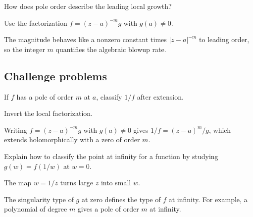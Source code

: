 \begin{exercise}\label{exr:iv09-expand-14}
How does pole order describe the leading local growth?
\end{exercise}
\begin{hint}
Use the factorization \(f=(z-a)^{-m}g\) with \(g(a)\ne0\).
\end{hint}
\begin{solution}
The magnitude behaves like a nonzero constant times \(|z-a|^{-m}\) to leading order, so the integer \(m\) quantifies the algebraic blowup rate.
\end{solution}

\subsection*{Challenge problems}

\begin{exercise}\label{exr:iv09-expand-15}
If \(f\) has a pole of order \(m\) at \(a\), classify \(1/f\) after extension.
\end{exercise}
\begin{hint}
Invert the local factorization.
\end{hint}
\begin{solution}
Writing \(f=(z-a)^{-m}g\) with \(g(a)\ne0\) gives \(1/f=(z-a)^m/g\), which extends holomorphically with a zero of order \(m\).
\end{solution}

\begin{exercise}\label{exr:iv09-expand-16}
Explain how to classify the point at infinity for a function by studying \(g(w)=f(1/w)\) at \(w=0\).
\end{exercise}
\begin{hint}
The map \(w=1/z\) turns large \(z\) into small \(w\).
\end{hint}
\begin{solution}
The singularity type of \(g\) at zero defines the type of \(f\) at infinity. For example, a polynomial of degree \(m\) gives a pole of order \(m\) at infinity.
\end{solution}

